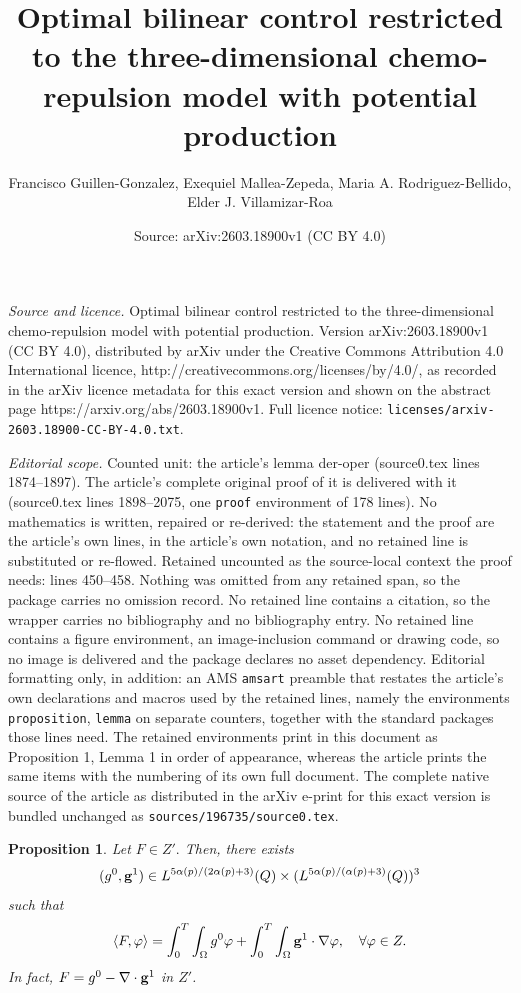 \documentclass[10pt,a4paper]{amsart}
\title{Optimal bilinear control restricted to the three-dimensional chemo-repulsion model with potential production}
\author{Francisco Guillen-Gonzalez, Exequiel Mallea-Zepeda, Maria A. Rodriguez-Bellido, Elder J. Villamizar-Roa}
\date{Source: arXiv:2603.18900v1 (CC BY 4.0)}
\newtheorem{proposition}{Proposition}
\begin{document}
\maketitle

\noindent\emph{Source and licence.} Optimal bilinear control restricted to the three-dimensional chemo-repulsion model with potential production. Version arXiv:2603.18900v1 (CC BY 4.0), distributed by arXiv under the Creative Commons Attribution 4.0 International licence, http://creativecommons.org/licenses/by/4.0/, as recorded in the arXiv licence metadata for this exact version and shown on the abstract page https://arxiv.org/abs/2603.18900v1. Full licence notice: \texttt{licenses/arxiv-2603.18900-CC-BY-4.0.txt}.\par\smallskip

\noindent\textit{Editorial scope.} Counted unit: the article's lemma der-oper (source0.tex lines 1874--1897). The article's complete original proof of it is delivered with it (source0.tex lines 1898--2075, one \texttt{proof} environment of 178 lines). No mathematics is written, repaired or re-derived: the statement and the proof are the article's own lines, in the article's own notation, and no retained line is substituted or re-flowed.  Retained uncounted as the source-local context the proof needs: lines 450--458.  Nothing was omitted from any retained span, so the package carries no omission record.  No retained line contains a citation, so the wrapper carries no bibliography and no bibliography entry.  No retained line contains a figure environment, an image-inclusion command or drawing code, so no image is delivered and the package declares no asset dependency.  Editorial formatting only, in addition: an AMS \texttt{amsart} preamble that restates the article's own declarations and macros used by the retained lines, namely the environments \texttt{proposition}, \texttt{lemma} on separate counters, together with the standard packages those lines need.  The retained environments print in this document as Proposition 1, Lemma 1 in order of appearance, whereas the article prints the same items with the numbering of its own full document.  The complete native source of the article as distributed in the arXiv e-print for this exact version is bundled unchanged as \texttt{sources/196735/source0.tex}.
\begin{proposition}\label{ident}
Let $F\in Z'.$ Then, there exists 
$$(g^0,{\bf g}^1)\in L^{5\alpha(p)/(2\alpha(p)+3)}(Q)\times (L^{5\alpha(p)/(\alpha(p)+3)}(Q))^3$$ such that
$$\langle F,\varphi\rangle=
\int_0^T\int_\Omega g^0\varphi+\int_0^T\int_\Omega {\bf g}^1\cdot\nabla \varphi,
\quad \forall\varphi\in Z.
$$
In fact, $F=g^0-\nabla\cdot {\bf g}^1$ in $Z'$.
\end{proposition}
\end{document}
